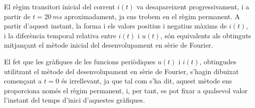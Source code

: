 \begin{exemple}
    El règim transitori inicial del corrent $i(t)$ va desapareixent progressivament, i a partir de $t=\qty{20}{ms}$ aproximadament, ja ens trobem en el règim permanent.
    A partir d'aquest instant, la forma i els valors positius i negatius màxims de $i(t)$, i la diferència temporal relativa entre $i(t)$ i $u(t)$, són equivalents als obtinguts mitjançant el mètode inicial del desenvolupament en sèrie de Fourier.

    El fet que les gràfiques de les funcions periòdiques $u(t)$ i  $i(t)$, obtingudes utilitzant el mètode del desenvolupament en sèrie de Fourier, s'hagin dibuixat començant a $t=0$ és irrellevant, ja que tal com s'ha dit,   aquest mètode ens proporciona només el règim permanent, i, per tant, es pot fixar a qualsevol valor l'instant del temps d'inici d'aquestes gràfiques.
\end{exemple}
